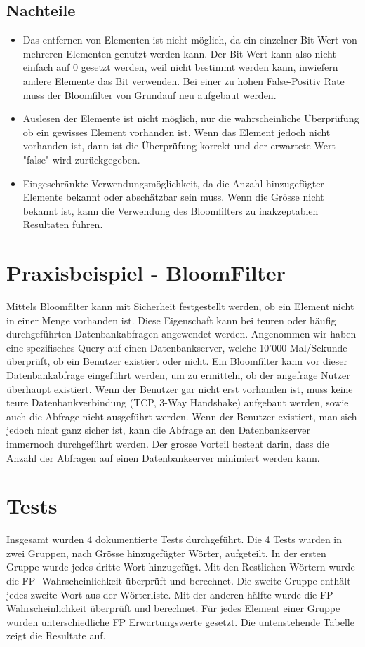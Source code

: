 \documentclass[11pt]{article} %
\begin{document}
	\subsection {Nachteile}
		\begin{itemize}
			\item Das entfernen von Elementen ist nicht möglich, da ein einzelner Bit-Wert von mehreren Elementen genutzt werden kann. Der Bit-Wert kann also nicht einfach auf 0 gesetzt werden, weil nicht bestimmt werden kann, inwiefern andere Elemente das Bit verwenden. Bei einer zu hohen False-Positiv Rate muss der Bloomfilter von Grundauf neu aufgebaut werden.
			\item Auslesen der Elemente ist nicht möglich, nur die wahrscheinliche Überprüfung ob ein gewisses Element vorhanden ist. Wenn das Element jedoch nicht vorhanden ist, dann ist die Überprüfung korrekt und der erwartete Wert "false" wird zurückgegeben.
			\item Eingeschränkte Verwendungsmöglichkeit, da die Anzahl hinzugefügter Elemente bekannt oder abschätzbar sein muss. Wenn die Grösse nicht bekannt ist, kann die Verwendung des Bloomfilters zu inakzeptablen Resultaten führen.
		\end{itemize}

\section{Praxisbeispiel - BloomFilter}

Mittels Bloomfilter kann mit Sicherheit festgestellt werden, ob ein Element nicht in einer Menge vorhanden ist. Diese Eigenschaft kann bei teuren oder häufig durchgeführten Datenbankabfragen angewendet werden. Angenommen wir haben eine spezifisches Query auf einen Datenbankserver, welche 10'000-Mal/Sekunde überprüft, ob ein Benutzer existiert oder nicht. Ein Bloomfilter kann vor dieser Datenbankabfrage eingeführt werden, um zu ermitteln, ob der angefrage Nutzer überhaupt existiert. Wenn der Benutzer gar nicht erst vorhanden ist, muss keine teure Datenbankverbindung (TCP, 3-Way Handshake) aufgebaut werden, sowie auch die Abfrage nicht ausgeführt werden. Wenn der Benutzer existiert, man sich jedoch nicht ganz sicher ist, kann die Abfrage an den Datenbankserver immernoch durchgeführt werden. Der grosse Vorteil besteht darin, dass die Anzahl der Abfragen auf einen Datenbankserver minimiert werden kann.

\section{Tests}
Insgesamt wurden 4 dokumentierte Tests durchgeführt. Die 4 Tests wurden in zwei Gruppen, nach Grösse hinzugefügter Wörter, aufgeteilt. In der ersten Gruppe wurde jedes dritte Wort hinzugefügt. Mit den Restlichen Wörtern wurde die FP- Wahrscheinlichkeit überprüft und berechnet. 
Die zweite Gruppe enthält jedes zweite Wort aus der Wörterliste. Mit der anderen hälfte wurde die FP-Wahrscheinlichkeit überprüft und berechnet. Für jedes Element einer Gruppe wurden unterschiedliche FP Erwartungswerte gesetzt. Die untenstehende Tabelle zeigt die Resultate auf.
\end{document}
